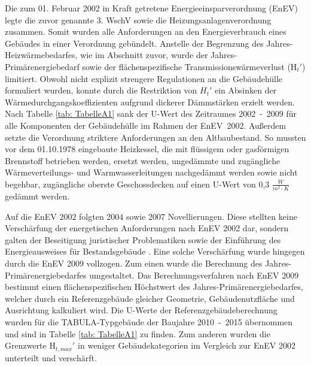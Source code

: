 Die zum 01. Februar 2002 in Kraft getretene Energieeinsparverordnung (EnEV) legte die zuvor genannte 3. WschV sowie die Heizungsanlagenverordnung zusammen. 
Somit wurden alle Anforderungen an den Energieverbrauch eines Gebäudes in einer Verordnung gebündelt.
Anstelle der Begrenzung des Jahres-Heizwärmebedarfes, wie im Abschnitt zuvor, wurde der Jahres-Primärenergiebedarf sowie der flächenspezifische Transmissionswärmeverlust (H\(_t'\)) limitiert.
Obwohl nicht explizit strengere Regulationen an die Gebäudehülle formuliert wurden, konnte durch die Restriktion von \(H_t'\) ein Absinken der Wärmedurchgangskoeffizienten aufgrund dickerer Dämmstärken erzielt werden.
Nach Tabelle \ref{tab: TabelleA1} sank der U-Wert des Zeitraumes \mbox{2002 - 2009} für alle Komponenten der Gebäudehülle im Rahmen der \mbox{EnEV 2002}.
Außerdem setzte die Verordnung striktere Anforderungen an den Altbaubestand. 
So mussten vor dem 01.10.1978 eingebaute Heizkessel, die mit flüssigem oder gasförmigen Brennstoff betrieben werden, ersetzt werden, ungedämmte und zugängliche Wärmeverteilungs- und Warmwasserleitungen nachgedämmt werden sowie nicht begehbar, zugängliche oberste Geschossdecken auf einen U-Wert von 0,3 \(\frac{W}{m^2 \cdot K} \) gedämmt werden.

Auf die EnEV 2002 folgten 2004 sowie 2007 Novellierungen.
Diese stellten keine Verschärfung der energetischen Anforderungen nach EnEV 2002 dar, sondern galten der Beseitigung juristischer Problematiken sowie der Einführung des Energieausweises für Bestandsgebäude \cite{Wild.2015}.
Eine solche Verschärfung wurde hingegen durch die EnEV 2009 vollzogen.
Zum einen wurde die Berechnung des Jahres-Primärenergiebedarfes umgestaltet.
Das Berechnungsverfahren nach EnEV 2009 bestimmt einen flächenspezifischen Höchstwert des Jahres-Primärenergiebedarfes, welcher durch ein Referenzgebäude gleicher Geometrie, Gebäudenutzfläche und Ausrichtung kalkuliert wird.
Die U-Werte der Referenzgebäudeberechnung wurden für die TABULA-Typgebäude der Baujahre \mbox{2010 - 2015} übernommen und sind in Tabelle \ref{tab: TabelleA1} zu finden.
Zum anderen wurden die Grenzwerte H\(_{t, max}'\) in weniger Gebäudekategorien im Vergleich zur EnEV 2002 unterteilt und verschärft.

